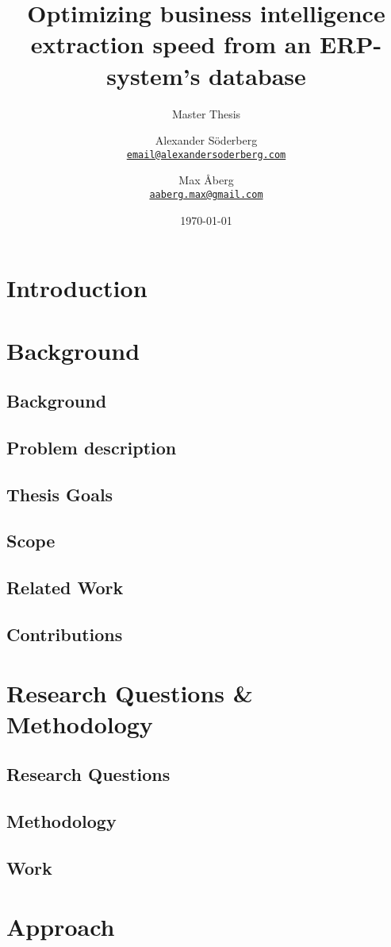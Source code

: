 \documentclass{cslthse-msc}
\author{
	Alexander Söderberg \\
	{\normalsize \href{mailto:email@alexandersoderberg.com}{\texttt{email@alexandersoderberg.com}}}
	\and
	Max Åberg \\
    {\normalsize \href{mailto:aaberg.max@gmail.com}{\texttt{aaberg.max@gmail.com}}}
}
\title{Optimizing business intelligence
extraction speed from an
ERP-system’s database}
\subtitle{Master Thesis}
\date{\today}
\begin{document}
\makefrontmatter
\chapter[Introduction]{Introduction}

\chapter{Background}
\section{Background}

\section{Problem description}
\section{Thesis Goals}
\section{Scope}
\section{Related Work}
\section{Contributions}

\chapter{Research Questions \& Methodology}
\section{Research Questions}
\section{Methodology}
\section{Work}

\chapter{Approach}
\end{document}

